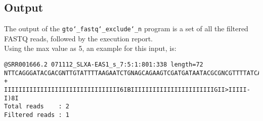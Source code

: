 \subsection*{Output}
The output of the \texttt{gto\char`_fastq\char`_exclude\char`_n} program is a set of all the filtered FASTQ reads, followed by the execution report.\\
Using the max value as 5, an example for this input, is: 
\begin{lstlisting}
@SRR001666.2 071112_SLXA-EAS1_s_7:5:1:801:338 length=72
NTTCAGGGATACGACGNTTGTATTTTAAGAATCTGNAGCAGAAGTCGATGATAATACGCGNCGTTTTATCAN
+
IIIIIIIIIIIIIIIIIIIIIIIIIIIIIIII6IBIIIIIIIIIIIIIIIIIIIIIIIGII>IIIII-I)8I
Total reads    : 2
Filtered reads : 1
\end{lstlisting}
